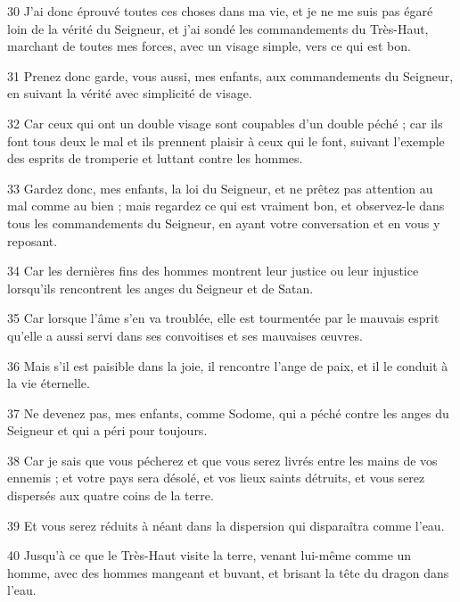 \par 30 J'ai donc éprouvé toutes ces choses dans ma vie, et je ne me suis pas égaré loin de la vérité du Seigneur, et j'ai sondé les commandements du Très-Haut, marchant de toutes mes forces, avec un visage simple, vers ce qui est bon.

\par 31 Prenez donc garde, vous aussi, mes enfants, aux commandements du Seigneur, en suivant la vérité avec simplicité de visage.

\par 32 Car ceux qui ont un double visage sont coupables d'un double péché ; car ils font tous deux le mal et ils prennent plaisir à ceux qui le font, suivant l'exemple des esprits de tromperie et luttant contre les hommes.

\par 33 Gardez donc, mes enfants, la loi du Seigneur, et ne prêtez pas attention au mal comme au bien ; mais regardez ce qui est vraiment bon, et observez-le dans tous les commandements du Seigneur, en ayant votre conversation et en vous y reposant.

\par 34 Car les dernières fins des hommes montrent leur justice ou leur injustice lorsqu'ils rencontrent les anges du Seigneur et de Satan.

\par 35 Car lorsque l'âme s'en va troublée, elle est tourmentée par le mauvais esprit qu'elle a aussi servi dans ses convoitises et ses mauvaises œuvres.

\par 36 Mais s'il est paisible dans la joie, il rencontre l'ange de paix, et il le conduit à la vie éternelle.

\par 37 Ne devenez pas, mes enfants, comme Sodome, qui a péché contre les anges du Seigneur et qui a péri pour toujours.

\par 38 Car je sais que vous pécherez et que vous serez livrés entre les mains de vos ennemis ; et votre pays sera désolé, et vos lieux saints détruits, et vous serez dispersés aux quatre coins de la terre.

\par 39 Et vous serez réduits à néant dans la dispersion qui disparaîtra comme l'eau.

\par 40 Jusqu'à ce que le Très-Haut visite la terre, venant lui-même comme un homme, avec des hommes mangeant et buvant, et brisant la tête du dragon dans l'eau.

